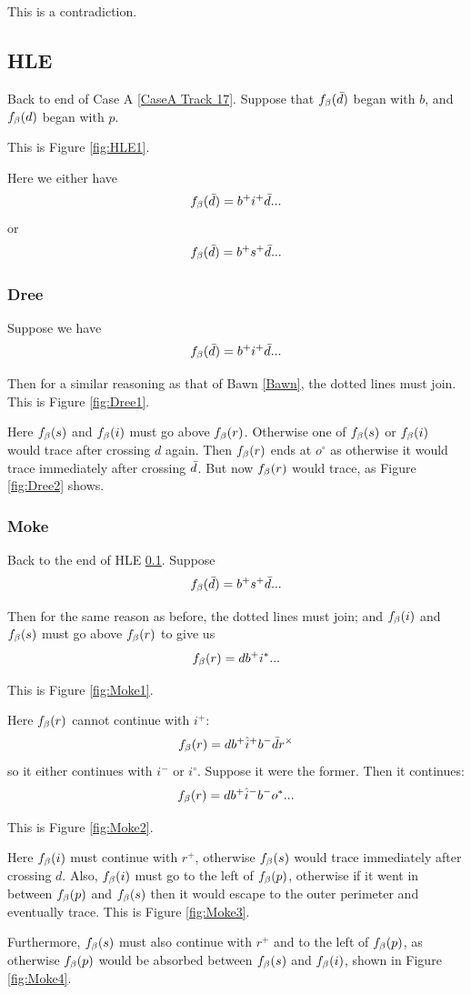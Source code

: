 This is a contradiction.

\subsection{HLE}\label{HLE}
Back to end of Case A \ref{CaseA Track 17}. Suppose that $f_\beta(\bar{d})$ began with $b$, and $f_\beta(d)$ began with $p$. 

This is Figure \ref{fig:HLE1}.

Here we either have
\[
f_\beta(\bar{d}) = b^+ i^+ \bar{d}...
\]
or
\[
f_\beta(\bar{d}) = b^+ s^+ \bar{d}...
\]

\subsubsection{Dree}\label{Dree}
Suppose we have
\[
f_\beta(\bar{d}) = b^+ i^+ \bar{d}...
\]

Then for a similar reasoning as that of Bawn \ref{Bawn}, the dotted lines must join. This is Figure \ref{fig:Dree1}.

Here $f_\beta(s)$ and $f_\beta(i)$ must go above $f_\beta(r)$. Otherwise one of $f_\beta(s)$ or $f_\beta(i)$ would trace after crossing $d$ again. Then $f_\beta(r)$ ends at $o^\circ$ as otherwise it would trace immediately after crossing $\bar{d}$. But now $f_\beta(r)$ would trace, as Figure \ref{fig:Dree2} shows.

\subsubsection{Moke}\label{Moke}
Back to the end of HLE \ref{HLE}. Suppose
\[
f_\beta(\bar{d}) = b^+ s^+ \bar{d}...
\]

Then for the same reason as before, the dotted lines must join; and $f_\beta(i)$ and $f_\beta(s)$ must go above $f_\beta(r)$ to give us
\[
f_\beta(r) = d b^+ i^*...
\]

This is Figure \ref{fig:Moke1}.

Here $f_\beta(r)$ cannot continue with $i^+$:
\[
f_\beta(r) = d b^+ \hat{i}^+ b^- \bar{d} r^\times
\]
so it either continues with $i^-$ or $i^\circ$. Suppose it were the former. Then it continues:
\[
f_\beta(r) = d b^+ \hat{i}^- b^- o^*...
\]

This is Figure \ref{fig:Moke2}.

Here $f_\beta(i)$ must continue with $r^+$, otherwise $f_\beta(s)$ would trace immediately after crossing $d$. Also, $f_\beta(i)$ must go to the left of $f_\beta(p)$, otherwise if it went in between $f_\beta(p)$ and $f_\beta(s)$ then it would escape to the outer perimeter and eventually trace. This is Figure \ref{fig:Moke3}.


Furthermore, $f_\beta(s)$ must also continue with $r^+$ and to the left of $f_\beta(p)$, as otherwise $f_\beta(p)$ would be absorbed between $f_\beta(s)$ and $f_\beta(i)$, shown in Figure \ref{fig:Moke4}.


